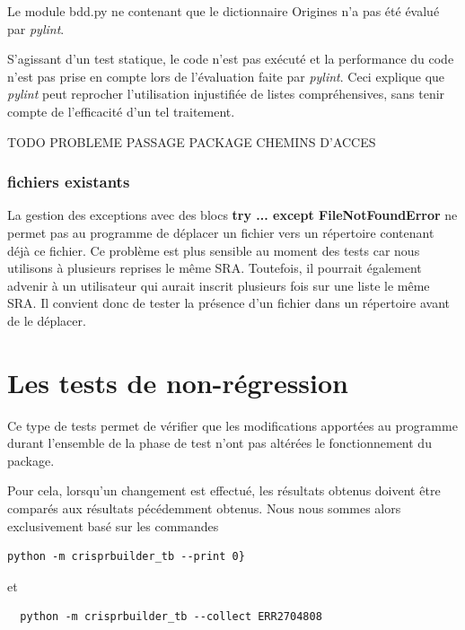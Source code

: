 \documentclass[twoside,a4paper,11pt,frenchb,openany]{report}
\begin{document}
Le module bdd.py ne contenant que le dictionnaire Origines n'a pas été évalué par \textit{pylint}.

S'agissant d'un test statique, le code n'est pas exécuté et la performance du code n'est pas prise en compte lors de l'évaluation faite par \textit{pylint}. Ceci explique que \textit{pylint} peut reprocher l'utilisation injustifiée de listes compréhensives, sans tenir compte de l'efficacité d'un tel traitement.

TODO PROBLEME PASSAGE PACKAGE
CHEMINS D'ACCES

\subsubsection{fichiers existants}

La gestion des exceptions avec des blocs \textbf{try ... except FileNotFoundError} ne permet pas au programme de déplacer un fichier vers un répertoire contenant déjà ce fichier. Ce problème est plus sensible au moment des tests car nous utilisons à plusieurs reprises le même SRA. Toutefois, il pourrait également advenir à un utilisateur qui aurait inscrit plusieurs fois sur une liste le même SRA. Il convient donc de tester la présence d'un fichier dans un répertoire avant de le déplacer.





\section{Les tests de non-régression}

Ce type de tests permet de vérifier que les modifications apportées au programme durant l'ensemble de la phase de test n'ont pas altérées le fonctionnement du package.

Pour cela, lorsqu'un changement est effectué, les résultats obtenus doivent être comparés aux résultats pécédemment obtenus. Nous nous sommes alors exclusivement basé sur les commandes

\begin{verbatim}python -m crisprbuilder_tb --print 0}\end{verbatim}

et 

\begin{verbatim}  python -m crisprbuilder_tb --collect ERR2704808\end{verbatim}
\end{document}
